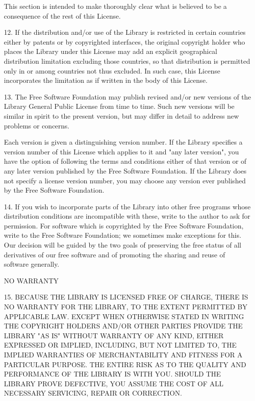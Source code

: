 \documentclass[twoside]{tceusermanual}
\begin{document}
This section is intended to make thoroughly clear what is
believed to be a consequence of the rest of this License.

12. If the distribution and/or use of the Library is restricted
in certain countries either by patents or by copyrighted
interfaces, the original copyright holder who places the Library
under this License may add an explicit geographical distribution
limitation excluding those countries, so that distribution is
permitted only in or among countries not thus excluded.  In such
case, this License incorporates the limitation as if written in
the body of this License.

13. The Free Software Foundation may publish revised and/or new
versions of the Library General Public License from time to
time. Such new versions will be similar in spirit to the present
version, but may differ in detail to address new problems or
concerns.

Each version is given a distinguishing version number.  If the
Library specifies a version number of this License which applies
to it and "any later version", you have the option of following
the terms and conditions either of that version or of any later
version published by the Free Software Foundation.  If the
Library does not specify a license version number, you may
choose any version ever published by the Free Software
Foundation.

14. If you wish to incorporate parts of the Library into other
free programs whose distribution conditions are incompatible
with these, write to the author to ask for permission.  For
software which is copyrighted by the Free Software Foundation,
write to the Free Software Foundation; we sometimes make
exceptions for this.  Our decision will be guided by the two
goals of preserving the free status of all derivatives of our
free software and of promoting the sharing and reuse of software
generally.

\begin{center}
NO WARRANTY
\end{center}

  15. BECAUSE THE LIBRARY IS LICENSED FREE OF CHARGE, THERE IS NO
WARRANTY FOR THE LIBRARY, TO THE EXTENT PERMITTED BY APPLICABLE LAW.
EXCEPT WHEN OTHERWISE STATED IN WRITING THE COPYRIGHT HOLDERS AND/OR
OTHER PARTIES PROVIDE THE LIBRARY "AS IS" WITHOUT WARRANTY OF ANY KIND,
EITHER EXPRESSED OR IMPLIED, INCLUDING, BUT NOT LIMITED TO, THE
IMPLIED WARRANTIES OF MERCHANTABILITY AND FITNESS FOR A PARTICULAR
PURPOSE.  THE ENTIRE RISK AS TO THE QUALITY AND PERFORMANCE OF THE
LIBRARY IS WITH YOU.  SHOULD THE LIBRARY PROVE DEFECTIVE, YOU ASSUME
THE COST OF ALL NECESSARY SERVICING, REPAIR OR CORRECTION.
\end{document}

